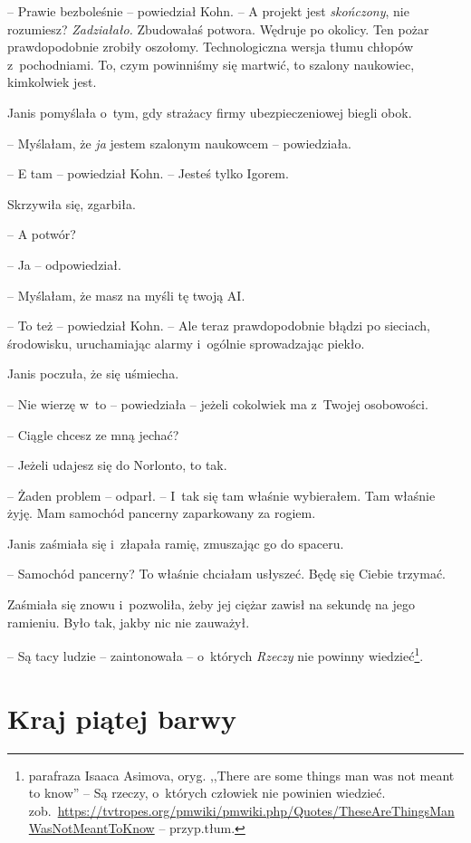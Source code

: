 \documentclass[oneside,polish,11pt,sfheadings]{mwbk}
\begin{document}
-- Prawie bezboleśnie -- powiedział Kohn. -- A projekt jest
\emph{skończony}, nie rozumiesz? \emph{Zadziałało.} Zbudowałaś potwora.
Wędruje po okolicy. Ten pożar prawdopodobnie zrobiły oszołomy.
Technologiczna wersja tłumu chłopów z~pochodniami. To, czym powinniśmy
się martwić, to szalony naukowiec, kimkolwiek jest.

Janis pomyślała o~tym, gdy strażacy firmy ubezpieczeniowej biegli obok.

-- Myślałam, że \emph{ja} jestem szalonym naukowcem -- powiedziała.

-- E tam -- powiedział Kohn. -- Jesteś tylko Igorem.

Skrzywiła się, zgarbiła.

-- A potwór?

-- Ja -- odpowiedział.

-- Myślałam, że masz na myśli tę twoją AI.

-- To też -- powiedział Kohn. -- Ale teraz prawdopodobnie błądzi po
sieciach, środowisku, uruchamiając alarmy i~ogólnie sprowadzając piekło.

Janis poczuła, że się uśmiecha. 

-- Nie wierzę w~to -- powiedziała -- jeżeli
cokolwiek ma z~Twojej osobowości.

-- Ciągle chcesz ze mną jechać?

-- Jeżeli udajesz się do Norlonto, to tak.

-- Żaden problem -- odparł. -- I~tak się tam właśnie wybierałem. Tam
właśnie żyję. Mam samochód pancerny zaparkowany za rogiem.

Janis zaśmiała się i~złapała ramię, zmuszając go do spaceru.

-- Samochód pancerny? To właśnie chciałam usłyszeć. Będę się Ciebie
trzymać.

Zaśmiała się znowu i~pozwoliła, żeby jej ciężar zawisł na sekundę na
jego ramieniu. Było tak, jakby nic nie zauważył.

-- Są tacy ludzie -- zaintonowała -- o~których \emph{Rzeczy} nie powinny
wiedzieć\footnote{parafraza Isaaca Asimova, oryg. ,,There are some things
man was not meant to know'' -- Są rzeczy, o~których człowiek nie powinien
wiedzieć. zob.~\url{https://tvtropes.org/pmwiki/pmwiki.php/Quotes/TheseAreThingsManWasNotMeantToKnow}
-- przyp.tłum.}.

\chapter{Kraj piątej barwy}
\end{document}
